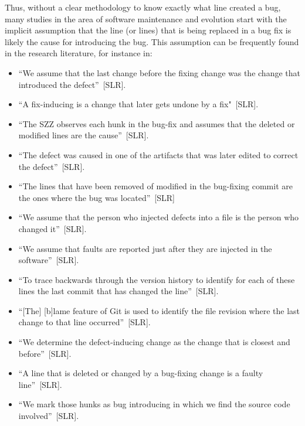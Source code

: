 \documentclass[a4paper, 12pt]{book}
\begin{document}
Thus, without a clear methodology to know exactly what line created a bug, many studies in the area of software maintenance and evolution start with the implicit assumption that the line (or lines) that is being replaced in a bug fix is likely the cause for introducing the bug. This assumption can be frequently found in the research literature, for instance in:

\begin{itemize}
  \item ``We assume that the last change before the fixing change was the change that introduced the defect''~[SLR\cite{cao2015investigating}].
  \item ``A fix-inducing is a change that later gets undone by a fix"~[SLR\cite{shippey2015exploiting}].
  \item ``The SZZ observes each hunk in the bug-fix and assumes that the deleted or modified lines are the cause''~[SLR\cite{shivaji2013efficient}].
  \item ``The defect was caused in one of the artifacts that was later edited to correct the defect''~[SLR\cite{vanhilst2011process}]. 
  \item ``The lines that have been removed of modified in the bug-fixing commit are the ones where the bug was located''~[SLR\cite{izquierdo2011developers}]
  \item ``We assume that the person who injected defects into a file is the person who changed it''~[SLR\cite{ando2015does}].
  \item ``We assume that faults are reported just after they are injected in the software''~[SLR\cite{yamada2014text}].
  \item ``To trace backwards through the version history to identify for each of these lines the last commit that has changed the line''~[SLR\cite{prechelt2014software}].
  \item ``[The] [b]lame feature of Git is used to identify the file revision where the last change to that line occurred''~[SLR\cite{bavota2015four}].
  \item ``We determine the defect-inducing change as the change that is closest and before''~[SLR\cite{wehaibi2016examining}].
  \item ``A line that is deleted or changed by a bug-fixing change is a faulty line''~[SLR\cite{tan2015online}].
  \item ``We mark those hunks as bug introducing in which we find the source code involved''~[SLR\cite{ferzund2009software}].
\end{itemize}
\end{document}
